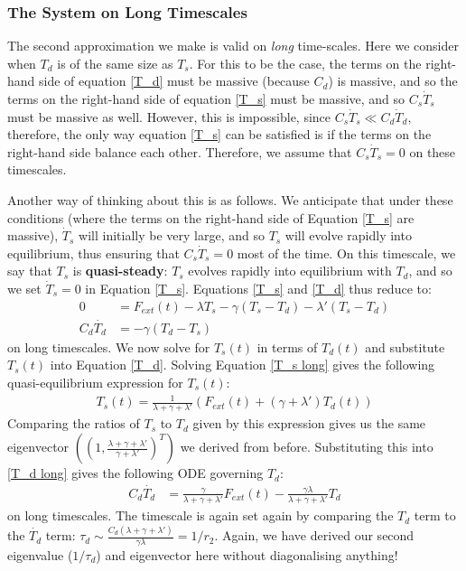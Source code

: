 \subsubsection{The System on Long Timescales}

The second approximation we make is valid on \textit{long} time-scales. Here we consider when $T_d$ is of the same size as $T_s$. For this to be the case, the terms on the right-hand side of equation \ref{T_d} must be massive (because $C_d$) is massive, and so the terms on the right-hand side of equation \ref{T_s} must be massive, and so $C_s \dot T_s$ must be massive as well. However, this is impossible, since $C_s \dot T_s \ll C_d \dot T_d$, therefore, the only way equation \ref{T_s} can be satisfied is if the terms on the right-hand side balance each other. Therefore, we assume that  $C_s \dot T_s=0$ on these timescales.

Another way of thinking about this is as follows. We anticipate that under these conditions (where the terms on the right-hand side of Equation \ref{T_s} are massive), $\dot T_s$ will initially be very large, and so $T_s$ will evolve rapidly into equilibrium, thus ensuring that $C_s \dot T_s=0$ most of the time. On this timescale, we say that $T_s$ is \textbf{quasi-steady}: $T_s$ evolves rapidly into equilibrium with $T_d$, and so we set $\dot T_s=0$ in Equation \ref{T_s}. Equations \ref{T_s} and \ref{T_d} thus reduce to:
\begin{align}
    0 & = F_{ext}(t)-\lambda T_s -\gamma (T_s-T_d) - \lambda'(T_s-T_d) \label{T_s long} \\ 
    C_d \dot{T_d} &= -\gamma (T_d-T_s) \label{T_d long}
\end{align}
on long timescales. We now solve for $T_s(t)$ in terms of $T_d(t)$ and substitute $T_s(t)$ into Equation \ref{T_d}. Solving Equation \ref{T_s long} gives the following quasi-equilibrium expression for $T_s(t)$:
\begin{align*}
    T_s(t)=\frac{1}{\lambda+\gamma+\lambda'}\left(F_{ext}(t)+(\gamma+\lambda ')T_d(t)\right)
\end{align*}
Comparing the ratios of $T_s$ to $T_d$ given by this expression gives us the same eigenvector $\left( \left( 1,\frac{\lambda+\gamma+\lambda'}{\gamma+\lambda'} \right)^T \right)$ we derived from before. Substituting this into \ref{T_d long} gives the following ODE governing $T_d$:
\begin{align}
    C_d \dot{T_d} &= \frac{\gamma}{\lambda+\gamma+\lambda'}F_{ext}(t) - \frac{\gamma\lambda}{\lambda+\gamma+\lambda'}T_d\label{T_d long T_s} 
\end{align}
on long timescales. The timescale is again set again by comparing the $T_d$ term to the $\dot{T_d}$ term: $\tau_d\sim \frac{C_d(\lambda+\gamma+\lambda')}{\gamma\lambda}=1/r_2$. Again, we have derived our second eigenvalue ($1/\tau_d$) and eigenvector here without diagonalising anything!

